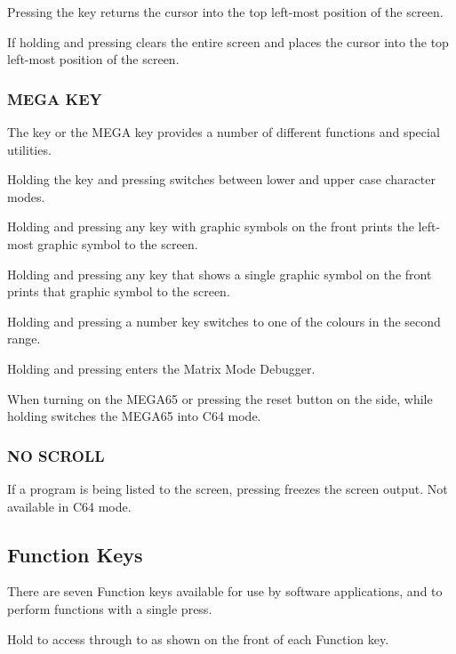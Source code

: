Pressing the  key returns the cursor into the top left-most position of the screen.

If holding  and pressing  clears the entire screen and places the cursor into the top left-most position of the screen.

\subsubsection{MEGA KEY}

The \megasymbolkey key or the MEGA key provides a number of different functions and special utilities.

Holding the  key and pressing \megasymbolkey switches between lower and upper case character modes.

Holding \megasymbolkey and pressing any key with graphic symbols on the front prints the left-most graphic symbol to the screen.

Holding \megasymbolkey and pressing any key that shows a single graphic symbol on the front prints that graphic symbol to the screen.

Holding \megasymbolkey and pressing a number key switches to one of the colours in the second range.

Holding \megasymbolkey and pressing  enters the Matrix Mode Debugger.

When turning on the MEGA65 or pressing the reset button on the side, while holding \megasymbolkey switches the MEGA65 into C64 mode.

\subsubsection{NO SCROLL}
If a program is being listed to the screen, pressing  freezes the screen output. Not available in C64 mode.


\subsection{Function Keys}

There are seven Function keys available for use by software applications,       and  to perform functions with a single press.

Hold  to access  through to  as shown on the front of each Function key.

